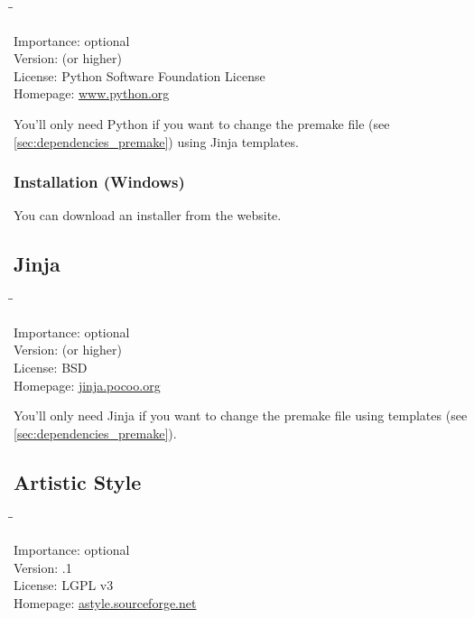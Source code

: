 \begin{tabbing}
  \hspace*{6em}\=\=\kill

  Importance:  \> optional \\
  Version:      (or higher) \\
  License:     \> Python Software Foundation License \\
  Homepage:    \> \href{http://www.python.org/}{www.python.org}
\end{tabbing}

You'll only need Python if you want to change the premake file (see
\ref{sec:dependencies_premake}) using Jinja templates.

\subsubsection{Installation (Windows)}

You can download an installer from the website.

\subsection{Jinja}

\begin{tabbing}
  \hspace*{6em}\=\=\kill

  Importance:  \> optional \\
  Version:      (or higher) \\
  License:     \> BSD \\
  Homepage:    \> \href{http://jinja.pocoo.org/}{jinja.pocoo.org}
\end{tabbing}

You'll only need Jinja if you want to change the premake file using
templates (see \ref{sec:dependencies_premake}).

\subsection{Artistic Style}

\begin{tabbing}
  \hspace*{6em}\=\=\kill

  Importance:  \> optional \\
  Version:     .1 \\
  License:     \> LGPL v3 \\
  Homepage:    \> \href{http://astyle.sourceforge.net/}{astyle.sourceforge.net}
\end{tabbing}

